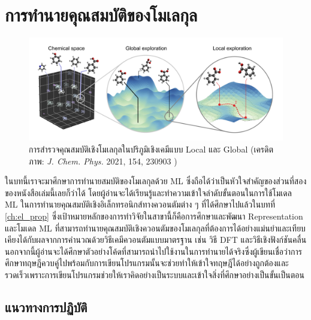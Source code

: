 

\chapter{การทำนายคุณสมบัติของโมเลกุล}
\label{ch:predict_molprop}

\begin{figure}[H]
    \centering
    \includegraphics[width=0.9\linewidth]{fig/ml_pred_chem.png}
    \caption{การสำรวจคุณสมบัติเชิงโมเลกุลในปริภูมิเชิงเคมีแบบ Local และ Global
        (เครดิตภาพ: \textit{J. Chem. Phys.} 2021, 154, 230903 \autocite{westermayr2021b})}
    \label{fig:ml_pred_chem}
\end{figure}

ในบทนี้เราจะมาศึกษาการทำนายสมบัติของโมเลกุลด้วย ML ซึ่งถือได้ว่าเป็นหัวใจสำคัญของส่วนที่สองของหนังสือเล่มนี้เลยก็ว่าได้ โดยผู้อ่านจะได้เรียนรู้และทำความเข้าใจลำดับขั้นตอนในการใช้โมเดล ML ในการทำนายคุณสมบัติเชิงอิเล็กทรอนิกส์ทางควอนตัมต่าง ๆ ที่ได้ศึกษาไปแล้วในบทที่ \ref{ch:el_prop} ซึ่งเป้าหมายหลักของการทำวิจัยในสาขานี้ก็คือการศึกษาและพัฒนา Representation และโมเดล ML ที่สามารถทำนายคุณสมบัติเชิงควอนตัมของโมเลกุลที่ต้องการได้อย่างแม่นยำและเทียบเคียงได้กับผลจากการคำนวณด้วยวิธีเคมีควอนตัมแบบมาตรฐาน เช่น วิธี DFT และวิธีเชิงฟังก์ชันคลื่น\autocite{ceriotti2018} นอกจากนี้ผู้อ่านจะได้ศึกษาตัวอย่างโค้ดที่สามารถนำไปใช้งานในการทำนายได้จริงซึ่งผู้เขียนเชื่อว่าการศึกษาทฤษฎีควบคู่ไปพร้อมกับการเขียนโปรแกรมนั้นจะช่วยทำให้เข้าใจทฤษฎีได้อย่างถูกต้องและรวดเร็วเพราะการเขียนโปรแกรมช่วยให้เราคิดอย่างเป็นระบบและเข้าใจสิ่งที่ศึกษาอย่างเป็นขั้นเป็นตอน

\section{แนวทางการปฏิบัติ}
\label{sec:pred_best_prac}

